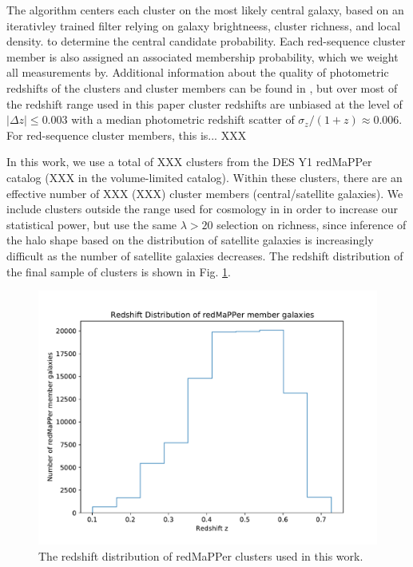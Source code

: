 \documentclass[fleqn,usenatbib]{mnras}
\begin{document}
The algorithm centers each cluster on the most likely central galaxy, based on an iterativley trained filter relying on galaxy brightneess, cluster richness, and local density. to determine the central candidate probability. Each red-sequence cluster member is also assigned an associated membership probability, which we weight all measurements by. Additional information about the quality of photometric redshifts of the clusters and cluster members can be found in \cite{2019MNRAS.482.1352M,wthetapaper}, but over most of the redshift range used in this paper cluster redshifts are unbiased at the level of $|\Delta z| \leq 0.003$ with a median photometric redshift scatter of $\sigma_z/(1+z)\approx 0.006$. For red-sequence cluster members, this is... XXX



In this work, we use a total of XXX clusters from the DES Y1 redMaPPer catalog (XXX in the volume-limited catalog). Within these clusters, there are an effective number of XXX (XXX) cluster members (central/satellite galaxies). We include clusters outside the range used for cosmology in \cite{2020arXiv200211124D} in order to increase our statistical power, but use the same $\lambda>20$ selection on richness, since inference of the halo shape based on the distribution of satellite galaxies is increasingly difficult as the number of satellite galaxies decreases. The redshift distribution of the final sample of clusters is shown in Fig. \ref{fig:zdist}.



\begin{figure}
\begin{center}
\includegraphics[width=\columnwidth]{z_hist.pdf}
\end{center}
\caption[]{The redshift distribution of redMaPPer clusters used in this work.
\label{fig:zdist}}
\end{figure}
\end{document}
